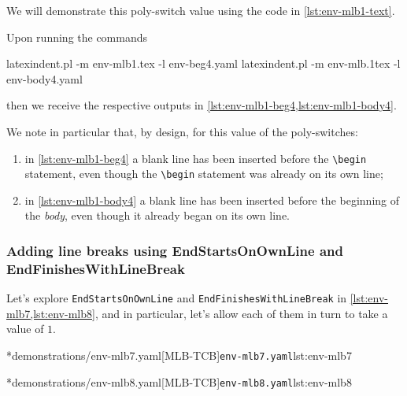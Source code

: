 	We will demonstrate this poly-switch value using the code in \cref{lst:env-mlb1-text}.


	Upon running the commands
	\begin{commandshell}
latexindent.pl -m env-mlb1.tex -l env-beg4.yaml
latexindent.pl -m env-mlb.1tex -l env-body4.yaml
\end{commandshell}

	then we receive the respective outputs in \cref{lst:env-mlb1-beg4,lst:env-mlb1-body4}.

	\begin{cmhtcbraster}[raster column skip=.1\linewidth]
	\end{cmhtcbraster}

	We note in particular that, by design, for this value of the poly-switches:
	\begin{enumerate}
		\item in \cref{lst:env-mlb1-beg4} a blank line has been inserted before the
		      \lstinline!\begin! statement, even though the \lstinline!\begin!
		      statement was already on its own line;
		\item in \cref{lst:env-mlb1-body4} a blank line has been inserted before the beginning of the
		      \emph{body}, even though it already began on its own line.
	\end{enumerate}

\subsubsection{Adding line breaks using EndStartsOnOwnLine and EndFinishesWithLineBreak}
	Let's explore \texttt{EndStartsOnOwnLine} and \texttt{EndFinishesWithLineBreak} in
	\cref{lst:env-mlb7,lst:env-mlb8}, and in particular, let's allow each of them in turn to take
	a value of $1$.

	\begin{minipage}{.49\textwidth}
		\cmhlistingsfromfile[style=yaml-LST]*{demonstrations/env-mlb7.yaml}[MLB-TCB]{\texttt{env-mlb7.yaml}}{lst:env-mlb7}
	\end{minipage}
	\hfill
	\begin{minipage}{.49\textwidth}
		\cmhlistingsfromfile[style=yaml-LST]*{demonstrations/env-mlb8.yaml}[MLB-TCB]{\texttt{env-mlb8.yaml}}{lst:env-mlb8}
	\end{minipage}

